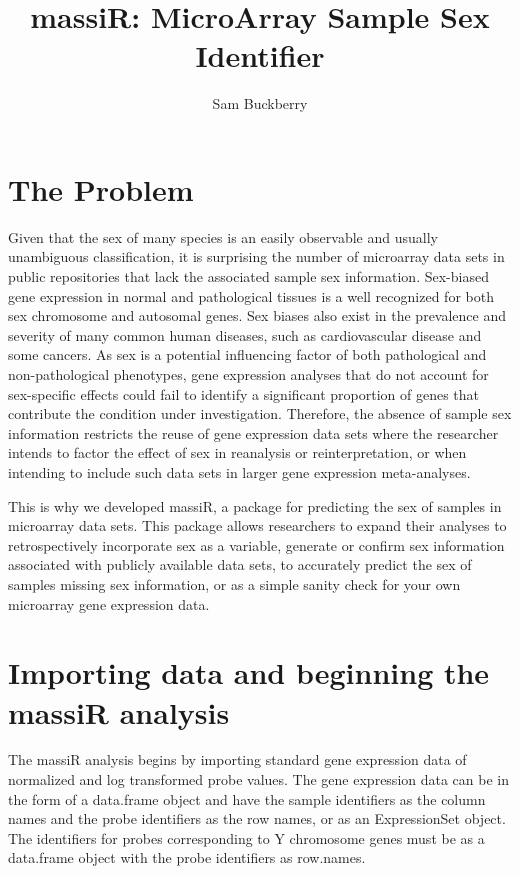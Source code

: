\documentclass{article}
\begin{document}


\title{massiR: MicroArray Sample Sex Identifier}
\author{Sam Buckberry}
\maketitle

\tableofcontents

\clearpage

\section{The Problem}
Given that the sex of many species is an easily observable and usually unambiguous classification, it is surprising the number of microarray data sets in public repositories that lack the associated sample sex information. Sex-biased gene expression in normal and pathological tissues is a well recognized for both sex chromosome and autosomal genes. Sex biases also exist in the prevalence and severity of many common human diseases, such as cardiovascular disease and some cancers. As sex is a potential influencing factor of both pathological and non-pathological phenotypes, gene expression analyses that do not account for sex-specific effects could fail to identify a significant proportion of genes that contribute the condition under investigation. Therefore, the absence of sample sex information restricts the reuse of gene expression data sets where the researcher intends to factor the effect of sex in reanalysis or reinterpretation, or when intending to include such data sets in larger gene expression meta-analyses. 

This is why we developed massiR, a package for predicting the sex of samples in microarray data sets. This package allows researchers to expand their analyses to retrospectively incorporate sex as a variable, generate or confirm sex information associated with publicly available data sets, to accurately predict the sex of samples missing sex information, or as a simple sanity check for your own microarray gene expression data.

\section{Importing data and beginning the massiR analysis}
The massiR analysis begins by importing standard gene expression data of normalized and log transformed probe values. The gene expression data can be in the form of a data.frame object and have the sample identifiers as the column names and the probe identifiers as the row names, or as an ExpressionSet object. The identifiers for probes corresponding to Y chromosome genes must be as a data.frame object with the probe identifiers as row.names.   
\end{document}
